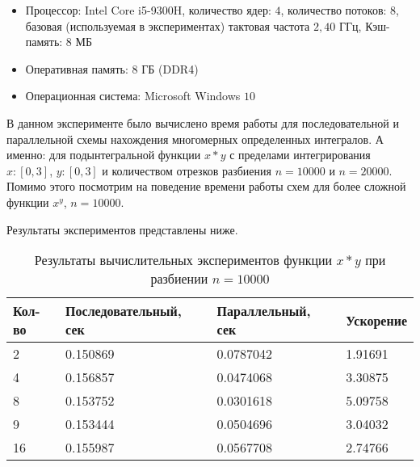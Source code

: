 \documentclass{report}
\begin{document}
\begin{itemize}
\item Процессор: Intel Core i5-9300H, количество ядер: $4$, количество потоков: $8$, базовая (используемая в экспериментах) тактовая частота $2,40$ ГГц, Кэш-память: $8$ МБ
\item Оперативная память: $8$ ГБ (DDR4)
\item Операционная система: Microsoft Windows $10$ 
\end{itemize}

\par В данном эксперименте было вычислено время работы для последовательной и параллельной схемы нахождения многомерных определенных интегралов. А именно: для подынтегральной функции $x * y$ с пределами интегрирования $x : [0, 3]$, $y : [0, 3]$ и количеством отрезков разбиения $n=10000$ и $n=20000$. Помимо этого посмотрим на поведение времени работы схем для более сложной функции $x^y$, $n=10000$.
\par Результаты экспериментов представлены ниже.

\begin{table}[!h]
    \begin{tabular}{ | p{4cm} | p{4cm} | p{4cm} | p{4cm} | }
    \hline
    Кол-во & Последовательный, сек & Параллельный, сек & Ускорение\\ \hline
    2    & 0.150869 & 0.0787042 & 1.91691 \\ \hline
    4    & 0.156857 & 0.0474068 & 3.30875\\ \hline
    8    & 0.153752 & 0.0301618 & 5.09758 \\ \hline
    9    & 0.153444 & 0.0504696 & 3.04032 \\ \hline
    16   & 0.155987 & 0.0567708 & 2.74766 \\ \hline
    \end{tabular}
    \caption{Результаты вычислительных экспериментов функции $x * y$ при разбиении $n=10000$}
\end{table}
\end{document}
